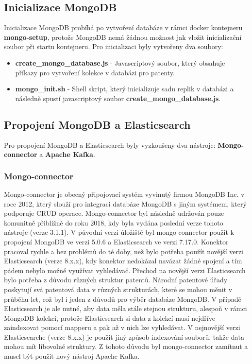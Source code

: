 \subsection{Inicializace MongoDB}
Inicializace MongoDB probíhá po vytvoření databáze v rámci docker kontejneru \textbf{mongo-setup}, protože MongoDB nemá žádnou možnost jak vložit inicializační soubor při startu kontejneru. Pro inicializaci byly vytvořeny dva soubory:
\begin{itemize}
\item \textbf{create\_mongo\_database.js} - Javascriptový soubor, který obsahuje příkazy pro vytvoření kolekce v databázi pro patenty.
\item \textbf{mongo\_init.sh} - Shell skript, který inicializuje sadu replik v databázi a následně spustí javascriptový soubor \textbf{create\_mongo\_database.js}.
\end{itemize}

\subsection{Propojení MongoDB a Elasticsearch}
Pro propojení MongoDB a Elasticsearch byly vyzkoušeny dva nástroje: \textbf{Mongo-connector} a \textbf{Apache Kafka}. 

\subsubsection{Mongo-connector}
Mongo-connector je obecný připojovací systém vyvinutý firmou MongoDB Inc. v roce 2012, který slouží pro integraci databáze MongoDB s jiným systémem, který podporuje \gls{CRUD} operace. Mongo-connector byl následně udržován pouze komunitně přibližně do roku 2018, kdy byla vydána poslední verze tohoto nástroje (verze 3.1.1).
\newline
\indent V původní verzi úložiště byl mongo-connector použit k propojení MongoDB ve verzi 5.0.6 a Elasticsearch ve verzi 7.17.0. Konektor pracoval rychle a bez problémů do té doby, než bylo potřeba použít novější verzi Elasticsearch (verze 8.x.x), kdy konektor nedokázal navázat žádné spojení a tím pádem nebylo možné využívat vyhledávač.
\newline
\indent Přechod na novější verzi Elasticsearch bylo potřeba z důvodu různých struktur patentů. Národní patentové úřady poskytují svá patentová data v různých strukturách, které se mohou měnit v průběhu let, což byl i jeden z důvodů pro výběr databáze MongoDB. V případě Elasticsearch je ale nutné, aby data měla stále stejnou strukturu, alespoň v rámci MongoDB kolekcí, protože Elasticsearch si data z kolekcí musí nejdříve zaindexovat pomocí mapperu a pak až v nich lze vyhledávat. V nejnovější verzi Elasticsearche (verze 8.x.x) je použit jiný způsob indexování souborů, takže data mohou mít libovolné struktury. Z tohoto důvodu byl mongo-connector zamítnut a musel být použit nový nástroj Apache Kafka.


